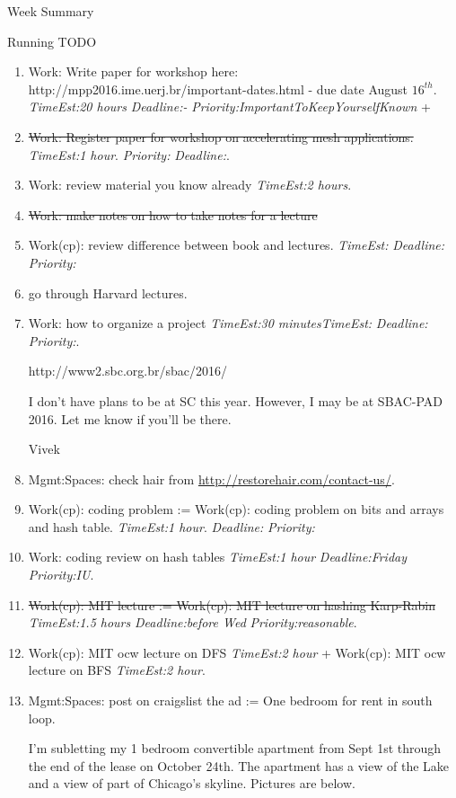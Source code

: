 \documentclass[serif, mathserif, final]{beamer}
\newcommand{\doneTask}[1]{\tiny \item \tiny \sout{#1}}
\newcommand{\te}[1]{\textit{TimeEst:}\textit{#1}}
\newcommand{\dl}[1]{\textit{Deadline:}\textit{#1}}
\newcommand{\pr}[1]{\textit{Priority:}\textit{#1}}
\begin{document}
\begin{frame}
\begin{columns}
\begin{column}{0.5\linewidth}
\begin{block}{Week Summary}
\begin{block}{Running TODO}
\begin{enumerate}
      \item \tiny Work: Write paper for workshop here: 
        http://mpp2016.ime.uerj.br/important-dates.html - due date
        August $16^{th}$.  \te{20 hours} \dl{-}
        \pr{ImportantToKeepYourselfKnown} + \doneTask{Work: Register
          paper for workshop on accelerating mesh applications.} \te{1
          hour}. \pr{} \dl{}.
 
      \item \tiny Work: review material you know already \te{2 hours}.
 
        \doneTask{ Work: make notes on how to take notes for a lecture}
      \item \tiny Work(cp): review difference between book and
        lectures. \te{} \dl{} \pr{} \item \tiny go through Harvard lectures. 
        
      \item \tiny Work: how to organize a project \te{30 minutes}\te{} \dl{}
        \pr{}. 



http://www2.sbc.org.br/sbac/2016/
        

I don't have plans to be at SC this year. However, I may be at
SBAC-PAD 2016. Let me know if you'll be there.

Vivek




\item \tiny Mgmt:Spaces: check hair from
  \url{http://restorehair.com/contact-us/}. 


      \item \tiny Work(cp): coding problem := Work(cp): coding
        problem on bits and arrays and hash table.  \te{1 hour}. \dl{} \pr{} 
        
      \item \tiny Work: coding review on hash tables \te{1 hour} \dl{Friday}
        \pr{IU}. \doneTask{Work(cp): MIT lecture := Work(cp): MIT lecture on
          hashing Karp-Rabin} \te{1.5 hours} \dl{before Wed}
        \pr{reasonable}. 
        
      \item \tiny Work(cp): MIT ocw lecture on DFS \te{2 hour} + Work(cp):
        MIT ocw lecture on BFS \te{2 hour}.

      \item \tiny Mgmt:Spaces: post on craigslist the ad :=
       One bedroom for rent in south loop.        

       I'm subletting my 1 bedroom convertible apartment from Sept 1st through the
       end of the lease on October 24th. The apartment has a view of
       the Lake and a view of part of Chicago's skyline. Pictures are
       below. 


\end{enumerate}
\end{block}
\end{block}
\end{column}
\end{columns}
\end{frame}
\end{document}
